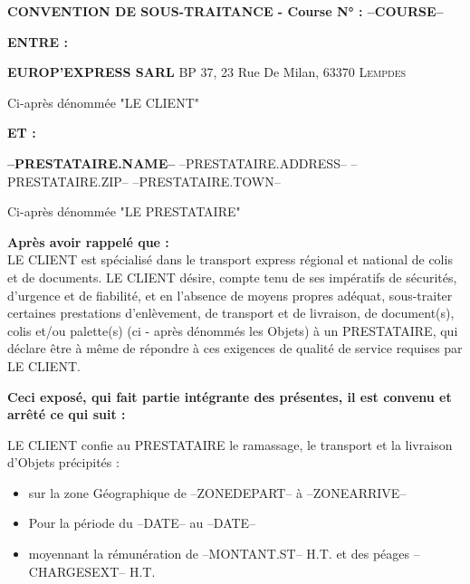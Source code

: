 \documentclass[a4paper, oneside, 8pt, french]{article}
\begin{document}
\begin{center}
\large \bf CONVENTION DE SOUS-TRAITANCE - Course N° : --COURSE--
\end{center}

\begin{fminipage}
\begin{minipage}[t]{0.10\textwidth}
\textbf{ENTRE :} 
\end{minipage}
\hspace{2mm}
\begin{minipage}[t]{0.88\textwidth}
\textbf{EUROP'EXPRESS SARL} \hspace{0.5cm} BP 37, 23 Rue De Milan, \textsc{63370 Lempdes}
\vspace{-10px}
\begin{flushright}
{\small Ci-après dénommée "LE CLIENT"}
\end{flushright}
\end{minipage}

\begin{minipage}[t]{0.10\textwidth}\textbf 
\textbf{ET :} 
\end{minipage}
\hspace{2mm}
\begin{minipage}[t]{0.89\textwidth}
\textbf{--PRESTATAIRE.NAME--} \hspace{0.5cm} --PRESTATAIRE.ADDRESS-- \textsc{--PRESTATAIRE.ZIP-- --PRESTATAIRE.TOWN--}
\vspace{-10px}
\begin{flushright}
{\small Ci-après dénommée "LE PRESTATAIRE"}
\end{flushright}
\end{minipage}
\end{fminipage}

\textbf {Après avoir rappelé que :}\\
LE CLIENT  est spécialisé dans le transport express régional et national de colis et de documents. LE CLIENT désire, compte tenu de ses  impératifs de sécurités, d'urgence et de fiabilité, et en l'absence de moyens propres adéquat, sous-traiter certaines prestations d'enlèvement, de transport et de livraison, de document(s), colis et/ou palette(s) (ci - après dénommés les Objets) à un PRESTATAIRE, qui déclare être à même de répondre à ces exigences de qualité de service requises par LE CLIENT.

\textbf{Ceci exposé, qui fait partie intégrante des présentes, il est convenu et arrêté ce qui suit :}\\
\begin{fminipage}
{LE CLIENT confie au PRESTATAIRE le ramassage, le transport et la livraison d'Objets précipités :}
\begin{itemize}
\item[\textbullet]sur la zone Géographique de --ZONEDEPART-- à --ZONEARRIVE--
\item[\textbullet]Pour la période du --DATE-- au --DATE--
\item[\textbullet]moyennant la rémunération de --MONTANT.ST-- H.T. et des péages --CHARGESEXT-- H.T.
\end{itemize}
\end{fminipage}
\end{document}
